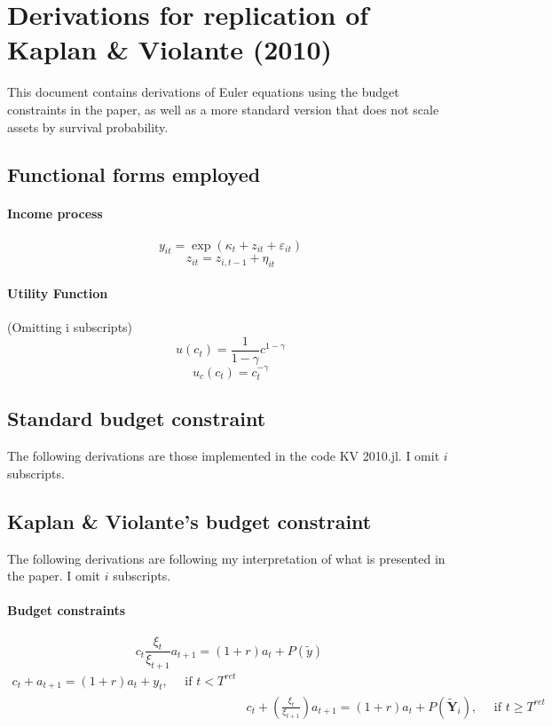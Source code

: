 \documentclass[11pt]{article}
\author{}
\date{}
\title{}
\begin{document}
\section*{Derivations for replication of Kaplan \& Violante (2010)}
This document contains derivations of Euler equations using the budget constraints in the paper, as well as a more standard version that does not scale assets by survival probability.

\subsection*{Functional forms employed}

\paragraph{Income process}
$$ y_{i t} =  \exp( \kappa_t + z_{i t} + \varepsilon_{i t})$$
$$ z_{i t} = z_{i,t-1} + \eta_{i t} $$

\paragraph{Utility Function}
(Omitting i subscripts)
$$ u(c_t) = \frac{1}{1-\gamma} c^{1-\gamma} $$
$$ u_c(c_t) = c_t^{-\gamma} $$


\subsection*{Standard budget constraint}

The following derivations are those implemented in the code {KV 2010.jl}. I omit $i$ subscripts.

\subsection*{Kaplan \& Violante's budget constraint}

The following derivations are following my interpretation of what is presented in the paper. I omit $i$ subscripts.

\paragraph{Budget constraints}
$$ c_t \frac{\xi_{t}}{\xi_{t+1}} a_{t+1} = (1+r) a_{t}+P(\tilde{y}) ~ $$
$$
\begin{aligned}
c_{t}+a_{t+1}=(1+r) a_{t}+y_{t}, \quad \text { if } t<T^{r e t}\\
&c_{t}+\left(\frac{\xi_{t}}{\xi_{t+1}}\right) a_{t+1}=(1+r) a_{t}+P\left(\tilde{\mathbf{Y}}_{i}\right), \quad \text { if } t \geq T^{r e t}
\end{aligned}
$$
\end{document}
